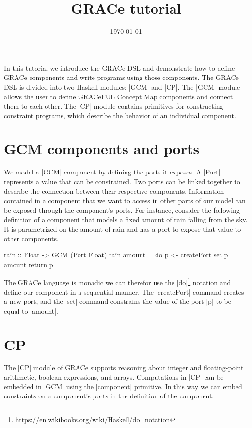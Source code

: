 \documentclass[a4paper]{article}
\title{GRACe tutorial}
\author{}
\date{\today}
\begin{document}
\maketitle

\noindent
In this tutorial we introduce the GRACe DSL and demonstrate how to define GRACe
components and write programs using those components. The GRACe DSL is divided
into two Haskell modules: |GCM| and |CP|. The |GCM| module allows the user to
define GRACeFUL Concept Map components and connect them to each other. The |CP|
module contains primitives for constructing constraint programs, which describe
the behavior of an individual component.


\section{GCM components and ports}

We model a |GCM| component by defining the ports it exposes. A |Port| represents
a value that can be constrained. Two ports can be linked together to describe
the connection between their respective components. Information contained in a
component that we want to access in other parts of our model can be exposed
through the component's ports. For instance, consider the following definition
of a component that models a fixed amount of rain falling from the sky.  It is
parametrized on the amount of rain and has a port to expose that value to other
components.
\begin{haskellcode}
rain :: Float -> GCM (Port Float)
rain amount = do
  p <- createPort
  set p amount
  return p
\end{haskellcode}
The GRACe language is monadic we can therefor use the
|do|\footnote{\url{https://en.wikibooks.org/wiki/Haskell/do_notation}} notation
and define our component in a sequential manner. The |createPort| command
creates a new port, and the |set| command constrains the value of the port
|p| to be equal to |amount|.


\section{CP}

The |CP| module of GRACe supports reasoning about integer and floating-point
arithmetic, boolean expressions, and arrays. Computations in |CP| can be
embedded in |GCM| using the |component| primitive. In this way we can embed
constraints on a component's ports in the definition of the component.
\end{document}
